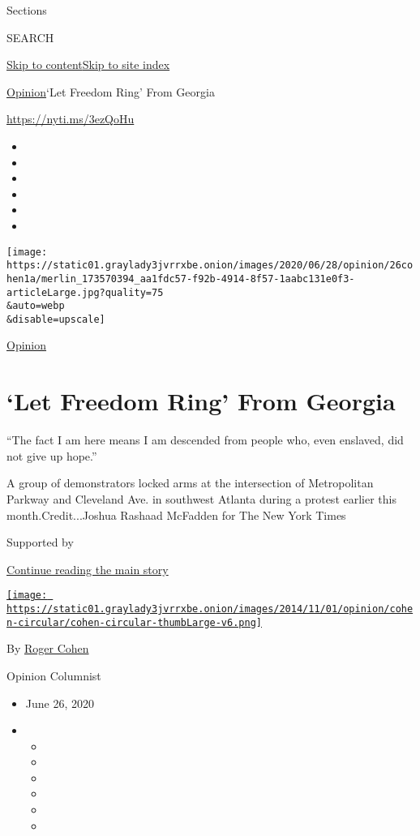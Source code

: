 Sections

SEARCH

\protect\hyperlink{site-content}{Skip to
content}\protect\hyperlink{site-index}{Skip to site index}

\href{/section/opinion}{Opinion}\textbar{}`Let Freedom Ring' From
Georgia

\url{https://nyti.ms/3ezQoHu}

\begin{itemize}
\item
\item
\item
\item
\item
\item
\end{itemize}

\texttt{[image: https://static01.graylady3jvrrxbe.onion/images/2020/06/28/opinion/26cohen1a/merlin\_173570394\_aa1fdc57-f92b-4914-8f57-1aabc131e0f3-articleLarge.jpg?quality=75\\\&auto=webp\\\&disable=upscale]}

\href{/section/opinion}{Opinion}

\hypertarget{let-freedom-ring-from-georgia}{%
\section{`Let Freedom Ring' From
Georgia}\label{let-freedom-ring-from-georgia}}

``The fact I am here means I am descended from people who, even
enslaved, did not give up hope.''

A group of demonstrators locked arms at the intersection of Metropolitan
Parkway and Cleveland Ave. in southwest Atlanta during a protest earlier
this month.Credit...Joshua Rashaad McFadden for The New York Times

Supported by

\protect\hyperlink{after-sponsor}{Continue reading the main story}

\href{https://www.nytimes3xbfgragh.onion/by/roger-cohen}{\texttt{[image: https://static01.graylady3jvrrxbe.onion/images/2014/11/01/opinion/cohen-circular/cohen-circular-thumbLarge-v6.png]}}

By \href{https://www.nytimes3xbfgragh.onion/by/roger-cohen}{Roger Cohen}

Opinion Columnist

\begin{itemize}
\item
  June 26, 2020
\item
  \begin{itemize}
  \item
  \item
  \item
  \item
  \item
  \item
  \end{itemize}
\end{itemize}

